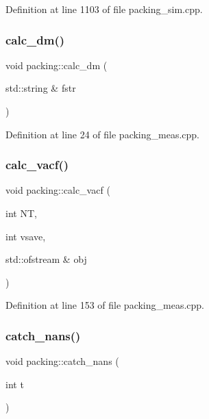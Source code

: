 Definition at line 1103 of file packing\+\_\+sim.\+cpp.

\mbox{\label{classpacking_ad87b894a228262a83190cae54f8a8bb2}} 
\subsubsection{\texorpdfstring{calc\+\_\+dm()}{calc\_dm()}}
{\footnotesize\ttfamily void packing\+::calc\+\_\+dm (\begin{DoxyParamCaption}\item[{std\+::string \&}]{fstr }\end{DoxyParamCaption})}



Definition at line 24 of file packing\+\_\+meas.\+cpp.

\mbox{\label{classpacking_afaa70769d1b1faadad9e530f09fe26b9}} 
\subsubsection{\texorpdfstring{calc\+\_\+vacf()}{calc\_vacf()}}
{\footnotesize\ttfamily void packing\+::calc\+\_\+vacf (\begin{DoxyParamCaption}\item[{int}]{NT,  }\item[{int}]{vsave,  }\item[{std\+::ofstream \&}]{obj }\end{DoxyParamCaption})}



Definition at line 153 of file packing\+\_\+meas.\+cpp.

\mbox{\label{classpacking_ac31d7a9a0e3fde8ca3b527f6fc3f2b45}} 
\subsubsection{\texorpdfstring{catch\+\_\+nans()}{catch\_nans()}}
{\footnotesize\ttfamily void packing\+::catch\+\_\+nans (\begin{DoxyParamCaption}\item[{int}]{t }\end{DoxyParamCaption})}



